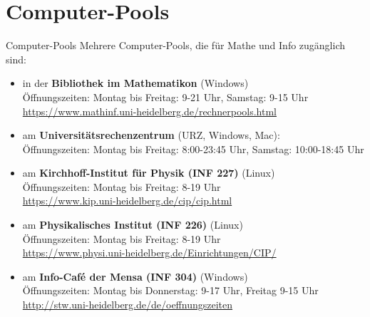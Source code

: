 \section{Computer-Pools}
\begin{frame}{Computer-Pools}
\fontsize{8}{9.2}\selectfont
    Mehrere Computer-Pools, die für Mathe und Info zugänglich sind:
    \begin{itemize}
        \item in der \textbf{Bibliothek im Mathematikon} (Windows)\\
            Öffnungszeiten: Montag bis Freitag: 9-21 Uhr, Samstag: 9-15 Uhr\\
            {\url{https://www.mathinf.uni-heidelberg.de/rechnerpools.html}}
        \item am \textbf{Universitätsrechenzentrum} (URZ, Windows, Mac):\\
            Öffnungszeiten: Montag bis Freitag: 8:00-23:45 Uhr, Samstag: 10:00-18:45 Uhr\\
        \item am \textbf{Kirchhoff-Institut für Physik (INF 227)} (Linux)\\
            Öffnungszeiten: Montag bis Freitag: 8-19 Uhr\\
            {\url{https://www.kip.uni-heidelberg.de/cip/cip.html}}
        \item am \textbf{Physikalisches Institut (INF 226)} (Linux)\\
            Öffnungszeiten: Montag bis Freitag: 8-19 Uhr\\
            {\url{https://www.physi.uni-heidelberg.de/Einrichtungen/CIP/}}
        \item am \textbf{Info-Café der Mensa (INF 304)} (Windows)\\
            Öffnungszeiten: Montag bis Donnerstag: 9-17 Uhr, Freitag 9-15 Uhr\\
            {\url{http://stw.uni-heidelberg.de/de/oeffnungszeiten}}
    \end{itemize}
\end{frame}

